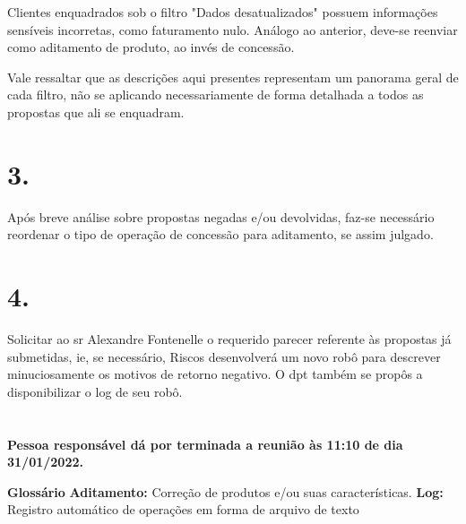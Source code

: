 \documentclass[a4paper, 11pt]{article}
\begin{document}
Clientes enquadrados sob o filtro "Dados desatualizados" possuem informações sensíveis incorretas, como faturamento nulo. Análogo ao anterior, deve-se reenviar como aditamento de produto, ao invés de concessão.

Vale ressaltar que as descrições aqui presentes representam um panorama geral de cada filtro, não se aplicando necessariamente de forma detalhada a todos as propostas que ali se enquadram. 


\section*{3. }
Após breve análise sobre propostas negadas e/ou devolvidas, faz-se necessário reordenar o tipo de operação de concessão para aditamento, se assim julgado.





\section*{4.} Solicitar ao sr Alexandre Fontenelle o requerido parecer referente às propostas já submetidas, ie, se necessário, Riscos desenvolverá um novo robô para descrever minuciosamente os motivos de retorno negativo. O dpt também se propôs a disponibilizar o log de seu robô.

 
 \section*{}
\textbf{Pessoa responsável dá por terminada a reunião às 11:10 de dia 31/01/2022.}

\setlength{\textwidth}{14cm}\textbf{Glossário}
\textbf{Aditamento:} Correção de produtos e/ou suas características.
\textbf{Log:} Registro automático de operações em forma de arquivo de texto




\end{document}

